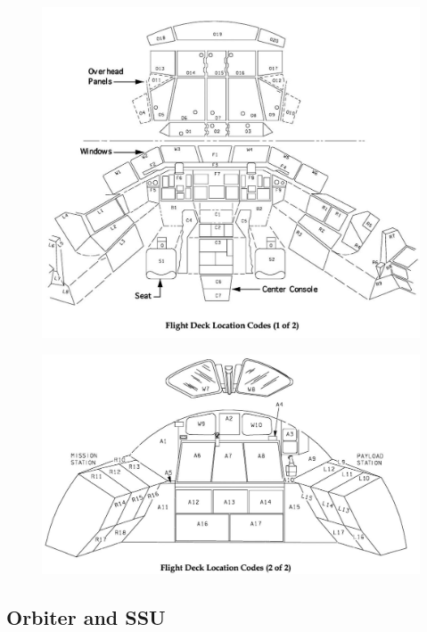 \documentclass[13pt]{article}
\begin{document}
\newpage
\begin{figure}[H]
  \centering
  \includegraphics[width=\textwidth,height=0.5\textheight,keepaspectratio]{Flight_Deck_Loc_Codes_1.jpg}
  \caption{}
  \label{fig:FlightDeckLocCodes1}
\end{figure}
\begin{figure}[H]
  \centering
  \includegraphics[width=\textwidth,height=0.35\textheight,keepaspectratio]{Flight_Deck_Loc_Codes_2.jpg}
  \caption{}
  \label{fig:FlightDeckLocCodes2}
\end{figure}

\newpage
\subsection{Orbiter and SSU}
\renewcommand{\cfttoctitlefont}{\bf}
\localtableofcontents
\end{document}
